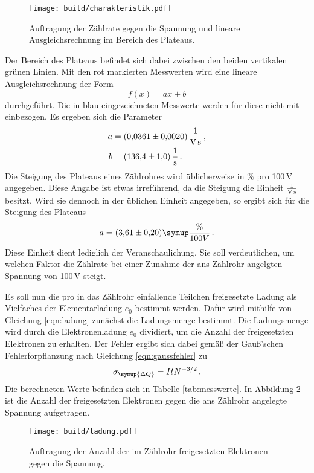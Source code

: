 \begin{figure}
  \centering
  \texttt{[image: build/charakteristik.pdf]}
  \caption{Auftragung der Zählrate gegen die Spannung und lineare Ausgleichsrechnung
  im Bereich des Plateaus.}
  \label{fig:plateau}
\end{figure}

Der Bereich des Plateaus befindet sich dabei zwischen den
beiden vertikalen grünen Linien. Mit den rot markierten Messwerten wird eine lineare
Ausgleichsrechnung der Form
\begin{equation}
  f(x)=ax+b
\end{equation}
durchgeführt. Die in blau eingezeichneten Messwerte werden für diese nicht mit
einbezogen. Es ergeben sich die Parameter
\begin{align*}
  a &= (0{,}0361 \pm 0{,}0020)\, \frac{1}{\text{V\,s}} \,,\\
  b &= (136{,}4 \pm 1{,}0)\,\frac{1}{\text{s}} \,.
\end{align*}
Die Steigung des Plateaus eines Zählrohres wird üblicherweise in $\%$ pro 100\,V
angegeben. Diese Angabe ist etwas irreführend, da die Steigung die Einheit
$\frac{1}{\text{V\,s}}$ besitzt. Wird sie dennoch in der üblichen Einheit angegeben,
so ergibt sich für die Steigung des Plateaus
\begin{equation*}
  a=(3{,}61 \pm 0{,}20) \symup{\frac{\%}{100V}} \,.  %
\end{equation*}
Diese Einheit dient lediglich der Veranschaulichung. Sie soll verdeutlichen, um welchen
Faktor die Zählrate bei einer Zunahme der ans Zählrohr angelgten Spannung von 100\,V
steigt.

Es soll nun die pro in das Zählrohr einfallende Teilchen freigesetzte Ladung
als Vielfaches der Elementarladung $e_0$ bestimmt werden. Dafür wird mithilfe von
Gleichung \eqref{eqn:ladung} zunächst die Ladungsmenge bestimmt. Die Ladungsmenge wird durch die
Elektronenladung $e_0$ dividiert, um die Anzahl der freigesetzten Elektronen
zu erhalten. Der Fehler ergibt sich dabei
gemäß der Gauß'schen Fehlerforpflanzung nach Gleichung \eqref{eqn:gaussfehler} zu
\begin{equation*}
  \sigma_{\symup{\Delta Q}} =  I t N^{-3/2}\,.
\end{equation*}
Die berechneten Werte befinden sich in Tabelle \ref{tab:messwerte}.
In Abbildung \ref{fig:ladung} ist die Anzahl der freigesetzten Elektronen
gegen die ans Zählrohr angelegte Spannung aufgetragen.

\begin{figure}
  \centering
  \texttt{[image: build/ladung.pdf]}
  \caption{Auftragung der Anzahl der im Zählrohr freigesetzten Elektronen gegen die Spannung.}
  \label{fig:ladung}
\end{figure}

